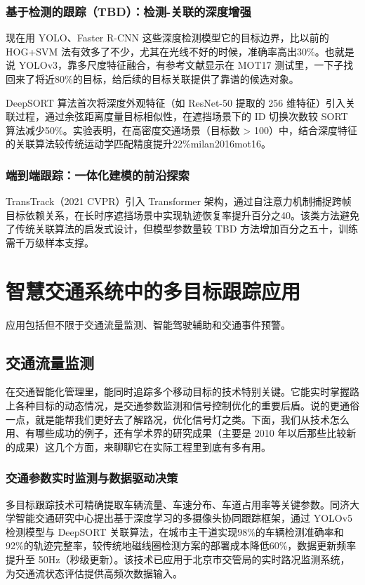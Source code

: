 \subsubsection{基于检测的跟踪（TBD）：检测-关联的深度增强}
现在用 YOLO、Faster R-CNN 这些深度检测模型它的目标边界，比以前的 HOG+SVM 法有效多了不少，尤其在光线不好的时候，准确率高出30\%。也就是说 YOLOv3，靠多尺度特征融合，有参考文献\cite{ren2015faster}显示在 MOT17 测试里，一下子找回来了将近80\%的目标，给后续的目标关联提供了靠谱的候选对象。

DeepSORT 算法首次将深度外观特征（如 ResNet-50 提取的 256 维特征）引入关联过程，通过余弦距离度量目标相似性，在遮挡场景下的 ID 切换次数较 SORT 算法减少50\%。实验表明，在高密度交通场景（目标数 > 100）中，结合深度特征的关联算法较传统运动学匹配精度提升22\%{milan2016mot16}。

\subsubsection{端到端跟踪：一体化建模的前沿探索}


TransTrack\cite{zhang2021transtrack}（2021 CVPR）引入 Transformer 架构，通过自注意力机制捕捉跨帧目标依赖关系，在长时序遮挡场景中实现轨迹恢复率提升百分之40。该类方法避免了传统关联算法的启发式设计，但模型参数量较 TBD 方法增加百分之五十，训练需千万级样本支撑。



\section{智慧交通系统中的多目标跟踪应用}

应用包括但不限于交通流量监测、智能驾驶辅助和交通事件预警。

\subsection{交通流量监测}

在交通智能化管理里，能同时追踪多个移动目标的技术特别关键。它能实时掌握路上各种目标的动态情况，是交通参数监测和信号控制优化的重要后盾。说的更通俗一点，就是能帮我们更好去了解路况，优化信号灯之类。下面，我们从技术怎么用、有哪些成功的例子，还有学术界的研究成果（主要是 2010 年以后那些比较新的成果）这几个方面，来聊聊它在实际工程里到底有多有用。

\subsubsection{交通参数实时监测与数据驱动决策}
多目标跟踪技术可精确提取车辆流量、车速分布、车道占用率等关键参数。同济大学智能交通研究中心\cite{tongji2022visual}提出基于深度学习的多摄像头协同跟踪框架，通过 YOLOv5 检测模型与 DeepSORT 关联算法，在城市主干道实现98\%的车辆检测准确率和92\%的轨迹完整率，较传统地磁线圈检测方案的部署成本降低60\%，数据更新频率提升至 50Hz（秒级更新）。该技术已应用于北京市交管局的实时路况监测系统，为交通流状态评估提供高频次数据输入。
